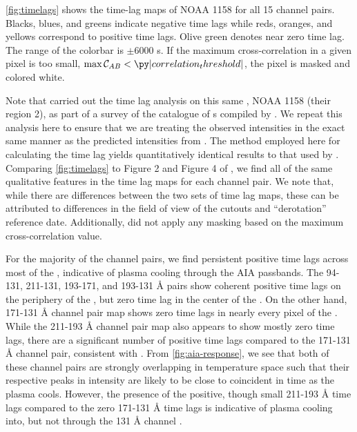 \autoref{fig:timelags} shows the time-lag maps of \AR{} NOAA 1158 for all 15 channel pairs.
Blacks, blues, and greens indicate negative time lags while reds, oranges, and yellows correspond to positive time lags.
Olive green denotes near zero time lag.
The range of the colorbar is $\pm6000$ s.
If the maximum cross-correlation in a given pixel is too small, $\max\mathcal{C}_{AB}<\py|correlation_threshold|$, the pixel is masked and colored white.

Note that  carried out the time lag analysis on this same \AR{}, NOAA 1158 (their region 2), as part of a survey of the catalogue of \AR{}s compiled by \citet{warren_systematic_2012}.
We repeat this analysis here to ensure that we are treating the observed intensities in the exact same manner as the predicted intensities from .
The method employed here for calculating the time lag  yields quantitatively identical results to that used by  \citep[see Section 2 of][]{viall_evidence_2012}.
Comparing \autoref{fig:timelags} to Figure 2 and Figure 4 of , we find all of the same qualitative features in the time lag maps for each channel pair.
We note that, while there are differences between the two sets of time lag maps, these can be attributed to differences in the field of view of the cutouts and ``derotation'' reference date.
Additionally,  did not apply any masking based on the maximum cross-correlation value.

For the majority of the channel pairs, we find persistent positive time lags across most of the \AR{}, indicative of plasma cooling through the AIA passbands.
The 94-131, 211-131, 193-171, and 193-131 \AA{} pairs show coherent positive time lags on the periphery of the \AR{}, but zero time lag in the center of the \AR{}.
On the other hand, 171-131 \AA{} channel pair map shows zero time lags in nearly every pixel of the \AR{}.
While the 211-193 \AA{} channel pair map also appears to show mostly zero time lags, there are a significant number of positive time lags compared to the 171-131 \AA{} channel pair, consistent with \citet{viall_evidence_2012,viall_survey_2017}.
From \autoref{fig:aia-response}, we see that both of these channel pairs are strongly overlapping in temperature space such that their respective peaks in intensity are likely to be close to coincident in time as the plasma cools.
However, the presence of the positive, though small 211-193 \AA{} time lags compared to the zero 171-131 \AA{} time lags is indicative of plasma cooling into, but not through the 131 \AA{} channel \citep{bradshaw_patterns_2016}.

